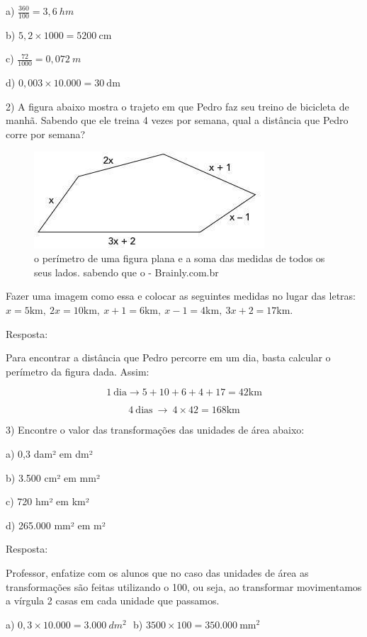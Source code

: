 a) \(\frac{360}{100} = 3,6\ hm\)

b) \(5,2 \times 1000 = 5200\ \text{cm}\)

c) \(\frac{72}{1000} = 0,072\ m\)

d) \(0,003 \times 10.000 = 30\ \text{dm}\)

2) A figura abaixo mostra o trajeto em que Pedro faz seu treino de
bicicleta de manhã. Sabendo que ele treina 4 vezes por semana, qual a
distância que Pedro corre por semana?

\begin{figure}
\centering
\includegraphics[width=3.38542in,height=1.42708in]{./imgSAEB_7_MAT/media/image86.jpg}
\caption{o perímetro de uma figura plana e a soma das medidas de todos
os seus lados. sabendo que o - Brainly.com.br}
\end{figure}

Fazer uma imagem como essa e colocar as seguintes medidas no lugar das
letras:
\(x = 5\text{km},\ 2x = 10\text{km},\ x + 1 = 6\text{km},\ x - 1 = 4\text{km},\ 3x + 2 = 17\text{km}\).

Resposta:

Para encontrar a distância que Pedro percorre em um dia, basta calcular
o perímetro da figura dada. Assim:

\[1\ \text{dia} \rightarrow 5 + 10 + 6 + 4 + 17 = 42\text{km}\]

\[4\ \text{dias}\  \rightarrow \ 4 \times 42 = 168\text{km}\]

3) Encontre o valor das transformações das unidades de área abaixo:

a) 0,3 dam² em dm²

b) 3.500 cm² em mm²

c) 720 hm² em km²

d) 265.000 mm² em m²

Resposta:

Professor, enfatize com os alunos que no caso das unidades de área as
transformações são feitas utilizando o 100, ou seja, ao transformar
movimentamos a vírgula 2 casas em cada unidade que passamos.

a)
\(0,3 \times 10.000 = 3.000\ dm^{2}\text{\ \ \ \ \ \ \ \ \ \ \ \ \ \ \ \ \ \ \ \ \ \ \ \ \ \ \ \ \ \ }\)b)
\(3500 \times 100 = 350.000\ \text{mm}^2\)

